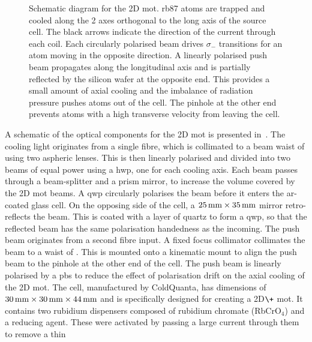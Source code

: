 \begin{figure}[!htbp]
	\centering
	\def\svgwidth{0.5\textwidth}
	
	\caption[Schematic for the 2D \ac{mot}]{Schematic diagram for the 2D \ac{mot}. \ac{rb87} atoms are trapped and cooled along the 2 axes orthogonal to the long axis of the source cell. The black arrows indicate the direction of the current through each coil. Each circularly polarised beam drives \(\sigma_-\) transitions for an atom moving in the opposite direction. A linearly polarised push beam propagates along the longitudinal axis and is partially reflected by the silicon wafer at the opposite end. This provides a small amount of axial cooling and the imbalance of radiation pressure pushes atoms out of the cell. The pinhole at the other end prevents atoms with a high transverse velocity from leaving the cell.}
	\label{fig:2D_mot_diagram}
\end{figure}
A schematic of the optical components for the 2D \ac{mot} is presented
in~. The cooling light originates from a single
fibre, which is collimated to a beam waist of
 using two aspheric lenses. This is then linearly polarised and divided
into two beams of equal power using a \ac{hwp}, one for each cooling axis. Each beam passes
through a beam-splitter and a prism mirror, to increase the volume covered by
the 2D \ac{mot} beams. A \ac{qwp} circularly polarises the beam before
it enters the ar-coated glass cell. On the opposing side of the cell, a
\(\sivalue{25}{\milli\metre} \times \sivalue{35}{\milli\metre}\) mirror retro-reflects the beam. This is coated with a layer of quartz to form a \ac{qwp}, so that the
reflected beam has the same polarisation handedness as the incoming.
The push beam originates from a second fibre input. A fixed focus collimator collimates
the beam to a  waist of . This is mounted onto a
 kinematic mount to align  the push beam to the  pinhole at the other end of the cell. The push beam is linearly polarised by a \ac{pbs} to reduce the effect of
polarisation drift on the axial cooling of the 2D \ac{mot}. The cell,
manufactured by ColdQuanta, has dimensions of \(\sivalue{30}{\milli\metre}
\times \sivalue{30}{\milli\metre} \times \sivalue{44}{\milli\metre}\) and is
specifically designed for creating a 2D\(\+\) \ac{mot}. It contains two rubidium
dispensers composed of rubidium chromate (RbCrO\(_4\)) and a reducing agent.
These were activated by passing a large current through them to remove a thin
